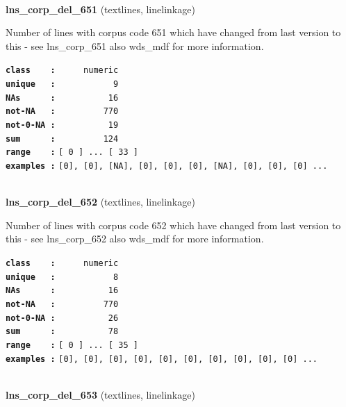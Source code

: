 \documentclass[]{article}
\begin{document}
~

\textbf{lns\_corp\_del\_651} (textlines, linelinkage)

Number of lines with corpus code 651 which have changed from last
version to this - see lns\_corp\_651 also wds\_mdf for more information.

\textbf{\texttt{class\ \ \ \ :}} \texttt{~~~~~numeric}\\
\textbf{\texttt{unique\ \ \ :}} \texttt{~~~~~~~~~~~9}\\
\textbf{\texttt{NAs\ \ \ \ \ \ :}} \texttt{~~~~~~~~~~16}\\
\textbf{\texttt{not-NA\ \ \ :}} \texttt{~~~~~~~~~770}\\
\textbf{\texttt{not-0-NA\ :}} \texttt{~~~~~~~~~~19}\\
\textbf{\texttt{sum\ \ \ \ \ \ :}} \texttt{~~~~~~~~~124}\\
\textbf{\texttt{range\ \ \ \ :}}
\texttt{{[}\ 0\ {]}\ ...\ {[}\ 33\ {]}}\\
\textbf{\texttt{examples\ :}}
\texttt{{[}0{]},\ {[}0{]},\ {[}NA{]},\ {[}0{]},\ {[}0{]},\ {[}0{]},\ {[}NA{]},\ {[}0{]},\ {[}0{]},\ {[}0{]}\ ...}\\

~

\textbf{lns\_corp\_del\_652} (textlines, linelinkage)

Number of lines with corpus code 652 which have changed from last
version to this - see lns\_corp\_652 also wds\_mdf for more information.

\textbf{\texttt{class\ \ \ \ :}} \texttt{~~~~~numeric}\\
\textbf{\texttt{unique\ \ \ :}} \texttt{~~~~~~~~~~~8}\\
\textbf{\texttt{NAs\ \ \ \ \ \ :}} \texttt{~~~~~~~~~~16}\\
\textbf{\texttt{not-NA\ \ \ :}} \texttt{~~~~~~~~~770}\\
\textbf{\texttt{not-0-NA\ :}} \texttt{~~~~~~~~~~26}\\
\textbf{\texttt{sum\ \ \ \ \ \ :}} \texttt{~~~~~~~~~~78}\\
\textbf{\texttt{range\ \ \ \ :}}
\texttt{{[}\ 0\ {]}\ ...\ {[}\ 35\ {]}}\\
\textbf{\texttt{examples\ :}}
\texttt{{[}0{]},\ {[}0{]},\ {[}0{]},\ {[}0{]},\ {[}0{]},\ {[}0{]},\ {[}0{]},\ {[}0{]},\ {[}0{]},\ {[}0{]}\ ...}\\

~

\textbf{lns\_corp\_del\_653} (textlines, linelinkage)
\end{document}
